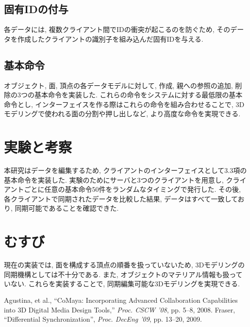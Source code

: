 \documentclass{AIabst}
\begin{document}
	\subsection{固有IDの付与}
	各データには, 複数クライアント間でIDの衝突が起こるのを防ぐため, そのデータを作成したクライアントの識別子を組み込んだ固有IDを与える.
	\subsection{基本命令}
	オブジェクト, 面, 頂点の各データモデルに対して, 作成, 親への参照の追加, 削除の3つの基本命令を実装した.
	これらの命令をシステムに対する最低限の基本命令とし, インターフェイスを作る際はこれらの命令を組み合わせることで, 3Dモデリングで使われる面の分割や押し出しなど, より高度な命令を実現できる.
\section{実験と考察}
本研究はデータを編集するため, クライアントのインターフェイスとして3.3項の基本命令を実装した.
実験のためにサーバと3つのクライアントを用意し, クライアントごとに任意の基本命令50件をランダムなタイミングで発行した.
 その後, 各クライアントで同期されたデータを比較した結果, データはすべて一致しており, 同期可能であることを確認できた.
\section{むすび}
 現在の実装では, 面を構成する頂点の順番を扱っていないため, 3Dモデリングの同期機構としては不十分である. また, オブジェクトのマテリアル情報も扱っていない.
これらを実装することで, 同期編集可能な3Dモデリングを実現できる.

\begin{thebibliography}{9}
	Agustina, et al., ``CoMaya: Incorporating Advanced Collaboration Capabilities into 3D Digital Media Design Tools,'' {\it Proc. CSCW '08}, pp. 5--8, 2008.
  Fraser,	``Differential Synchronization'',  {\it Proc. DecEng '09}, pp. 13--20, 2009.
\end{thebibliography}
\end{document}
